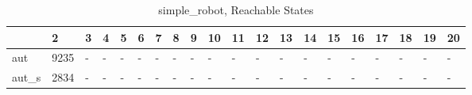 \begin{table}
\caption{simple_robot, Reachable States}
\label{simple_robot_reach}
\begin{tabular}{llllllllllllllllllll}
\toprule
 & 2 & 3 & 4 & 5 & 6 & 7 & 8 & 9 & 10 & 11 & 12 & 13 & 14 & 15 & 16 & 17 & 18 & 19 & 20 \\
\midrule
aut & 9235 & - & - & - & - & - & - & - & - & - & - & - & - & - & - & - & - & - & - \\
aut_s & 2834 & - & - & - & - & - & - & - & - & - & - & - & - & - & - & - & - & - & - \\
\bottomrule
\end{tabular}
\end{table}
